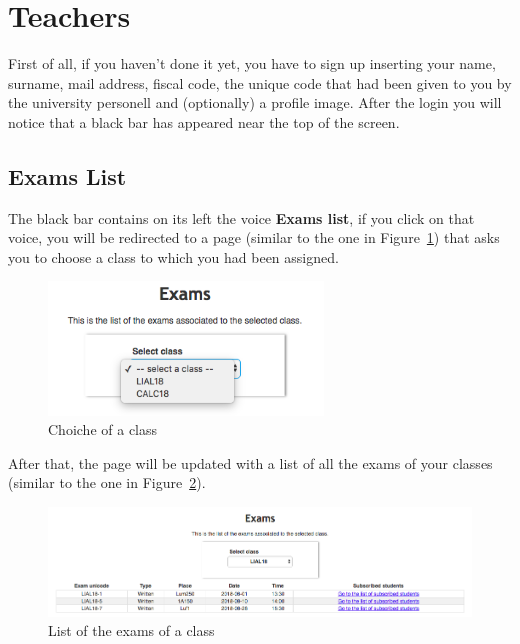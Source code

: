 \newpage
\section{Teachers}
First of all, if you haven't done it yet, you have to sign up inserting your name, surname, mail address, fiscal code, the unique code that had been given to you by the university personell and (optionally) a profile image.
After the login you will notice that a black bar has appeared near the top of the screen. 

\subsection{Exams List}
The black bar contains on its left the voice \textbf{Exams list}, if you click on that voice, you will be redirected to a page (similar to the one in Figure~\ref{fig:professorChooseExam}) that asks you to choose a class to which you had been assigned.
\begin{figure}[H]
	\centering
	\includegraphics[width=0.65\textwidth]{img/professorChooseExam.png}
	\caption{Choiche of a class}
	\label{fig:professorChooseExam}
\end{figure}

After that, the page will be updated with a list of all the exams of your classes (similar to the one in Figure~\ref{fig:professorExamsList}).
\begin{figure}[H]
\centering
\includegraphics[width=1.0\textwidth]{img/professorExamsList.png}
\caption{List of the exams of a class}
\label{fig:professorExamsList}
\end{figure}

